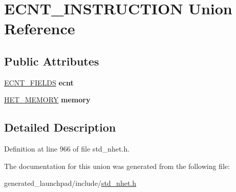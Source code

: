 \hypertarget{unionECNT__INSTRUCTION}{}\section{E\+C\+N\+T\+\_\+\+I\+N\+S\+T\+R\+U\+C\+T\+I\+ON Union Reference}
\label{unionECNT__INSTRUCTION}
\subsection*{Public Attributes}
\begin{DoxyCompactItemize}
\item 
\mbox{\label{unionECNT__INSTRUCTION_a19b79c8f0a9fd2c74af8d4d2c5d78e2a}} 
\mbox{\hyperlink{structecnt__format}{E\+C\+N\+T\+\_\+\+F\+I\+E\+L\+DS}} {\bfseries ecnt}
\item 
\mbox{\label{unionECNT__INSTRUCTION_a526daaf1268ac8643e1525ddeb97855d}} 
\mbox{\hyperlink{structmemory__format}{H\+E\+T\+\_\+\+M\+E\+M\+O\+RY}} {\bfseries memory}
\end{DoxyCompactItemize}


\subsection{Detailed Description}


Definition at line 966 of file std\+\_\+nhet.\+h.



The documentation for this union was generated from the following file\+:\begin{DoxyCompactItemize}
\item 
generated\+\_\+launchpad/include/\mbox{\hyperlink{std__nhet_8h}{std\+\_\+nhet.\+h}}\end{DoxyCompactItemize}
